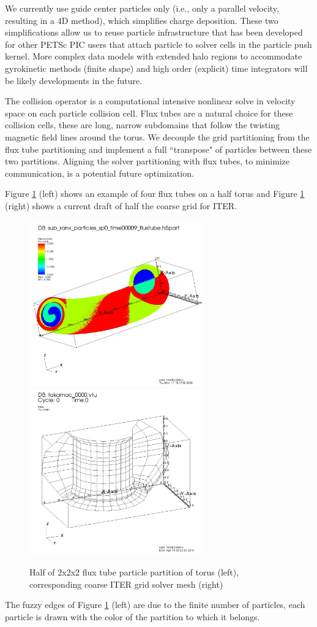 \documentclass[review]{siamart}
\begin{document}
We currently use guide center particles only (i.e., only a parallel velocity, resulting in a 4D method), which simplifies charge deposition.
These two simplifications allow us to reuse particle infrastructure that has been developed for other PETSc PIC users \cite{may2014ptatin} that attach particle to solver cells in the particle push kernel.
More complex data models with extended halo regions to accommodate gyrokinetic methods (finite shape) and high order (explicit) time integrators will be likely developments in the future.

The collision operator is a computational intensive nonlinear solve in velocity space on each particle collision cell.
Flux tubes are a natural choice for these collision cells, these are long, narrow subdomains that follow the twisting magnetic field lines around the torus.
We decouple the grid partitioning from the flux tube partitioning and implement a full ``transpose" of particles between these two partitions.
Aligning the solver partitioning with flux tubes, to minimize communication, is a potential future optimization.

Figure \ref{fig:cross} (left) shows an example of four flux tubes on a half torus and Figure \ref{fig:cross} (right) shows a current draft of half the coarse grid for ITER.
\begin{figure}[h!]
   \centering
   \includegraphics[width=75mm]{half_grid.jpeg} 
    \includegraphics[width=75mm]{half_grid_mesh.jpeg} 
   \caption{Half of  2x2x2 flux tube particle partition of torus (left), corresponding coarse ITER grid solver mesh (right)}
   \label{fig:cross}
\end{figure}
The fuzzy edges of Figure \ref{fig:cross} (left) are due to the finite number of particles, each particle is drawn with the color of the partition to which it belongs.
\end{document}

